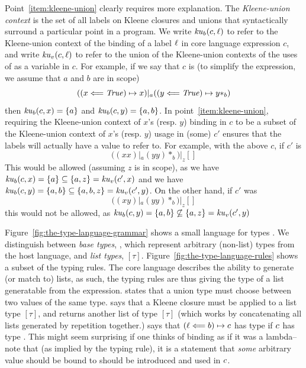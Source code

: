 Point~\ref{item:kleene-union} clearly requires more explanation.
The \textit{Kleene-union context} is the set of all labels
on Kleene closures and unions that syntactically surround
a particular point in a program.
We write $\mathit{ku}_b(c, \ell)$
to refer to the Kleene-union context of the binding of a label $\ell$ in core language expression $c$,
and write $\mathit{ku}_v(c, \ell)$ to refer to the union of the  Kleene-union contexts of the uses of \lab as a variable in $c$.
For example, if we say that $c$ is (to simplify the expression, we assume that $a$ and $b$ are in scope)
\[
((x \Longleftarrow \mathit{True}) \mapsto x) |_a ((y \Longleftarrow \mathit{True}) \mapsto y*_b)
\]
then $\mathit{ku}_b(c, x) = \{ a \}$
and  $\mathit{ku}_b(c, y) = \{ a, b \}$.
In point~\ref{item:kleene-union},
requiring the Kleene-union context of $x$'s (resp. $y$) binding in $c$ to be a subset of
the Kleene-union context of $x$'s (resp. $y$) usage in (some) $c'$
ensures that the labels will actually have a value to refer to.
For example, with the above $c$, if $c'$ is
\[
((x x) |_a (y y)*_b) |_z []
\]
This would be allowed (assuming $z$ is in scope),
as we have $\mathit{ku}_b(c, x) = \{a\} \subseteq \{a, z\} = \mathit{ku}_v(c', x)$
and we have $\mathit{ku}_b(c, y) = \{a, b\} \subseteq \{a, b, z\} = \mathit{ku}_v(c', y)$.
On the other hand, if $c'$ was
\[
((x y) |_a (y y)*_b) |_z []
\]
this would not be allowed,
as $\mathit{ku}_b(c, y) = \{a, b\} \not\subseteq \{a, z\} = \mathit{ku}_v(c', y)$


Figure~\ref{fig:the-type-language-grammar}
shows a small language for types \type.
We distinguish between \textit{base types}, \base,
which represent arbitrary (non-list) types from the host language,
and \textit{list types}, $[\tau]$.
Figure~\ref{fig:the-type-language-rules}
shows a subset of the typing rules.
The core language describes the ability to generate (or match to) lists,
as such,
the typing rules are thus giving the type of a list generatable from the expression.
\tyunion
states that a union type must choose between two values of the same type.
\tystar says that a Kleene closure must be applied
to a list type $[\tau]$,
and returns another list of type $[\tau]$
(which works by concatenating all lists generated by repetition together.)
\tybind says that $(\ell \Longleftarrow b) \mapsto c$ has type \type
if $c$ has type \type.
This might seem surprising if one thinks of binding as if it was a lambda--
note that (as implied by the typing rule),
it is a statement that \textit{some} arbitrary value
should be bound to \lab should be introduced
and used in $c$.

